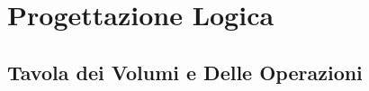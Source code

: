 \documentclass[12pt]{article} %
\begin{document}
		


	\section{Progettazione Logica}

		\subsection{Tavola dei Volumi e Delle Operazioni}

		
%
% 		
%
% 		
%
% 		
%
% 		
%
%
%
% 		
%
%
%
% 		
%
%
\end{document}
